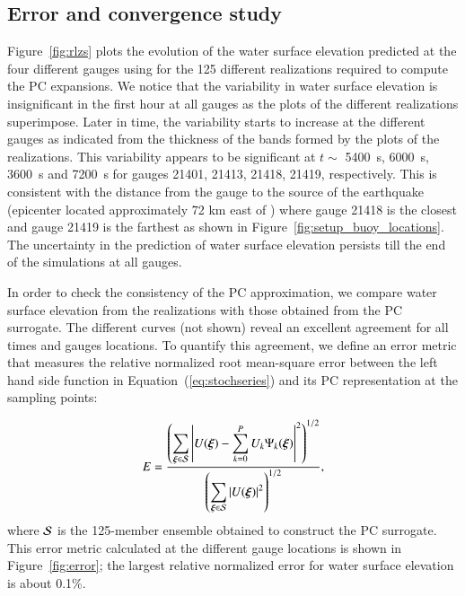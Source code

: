 \subsection{Error and convergence study}
\label{sec:analysis}

Figure~\ref{fig:rlzs} plots the evolution of the
water surface elevation predicted at the four different gauges 
using \geoclaw for the 125 different realizations 
required to compute the PC expansions. We notice that the 
variability in water surface elevation is insignificant in the first 
hour at all gauges as the plots of the different realizations superimpose.
Later in time, the variability starts to increase at the different gauges 
as indicated from the thickness of the bands formed by the plots of the realizations.
This variability appears to be significant at $t\sim$ 5400~s, 6000~s, 3600~s and 7200~s
for gauges 21401, 21413, 21418, 21419, respectively.
This is consistent with the distance from the gauge to the source of the earthquake
(epicenter located approximately 72 km east of \tohoku) where gauge 21418 is the closest and gauge 21419 is the farthest as shown in Figure~\ref{fig:setup_buoy_locations}.
The uncertainty in the prediction of water surface  elevation persists till the end of the simulations
at all gauges.

In order to check the consistency of the PC approximation, we compare
water surface elevation from the realizations 
with those obtained from the PC surrogate. The different curves (not shown) 
reveal an excellent agreement for all times and gauges locations.
To quantify this agreement, we define
an error metric that measures the relative normalized root mean-square error between the left hand side function 
in Equation~(\ref{eq:stochseries}) and its PC representation at the sampling points:

\begin{equation} 
   E = \frac{\displaystyle
         \left(\sum_{\xxi \in \NISP} \left|U(\xxi) - \sum_{k = 0}^{P}
U_k\Psi_k(\xxi)\right|^2
         \right)^{1/2}}
        {\displaystyle
          \left(\sum_{\xxi \in \NISP} \left|U(\xxi)\right|^2\right)^{1/2} 
          },
\label{eq:error}
\end{equation}
where $\mathcal{S}$ is the 125-member ensemble obtained to construct the PC surrogate. 
This error metric calculated at the different gauge locations is shown in Figure~\ref{fig:error};
the largest relative normalized error for 
water surface elevation is about 0.1\%. 


